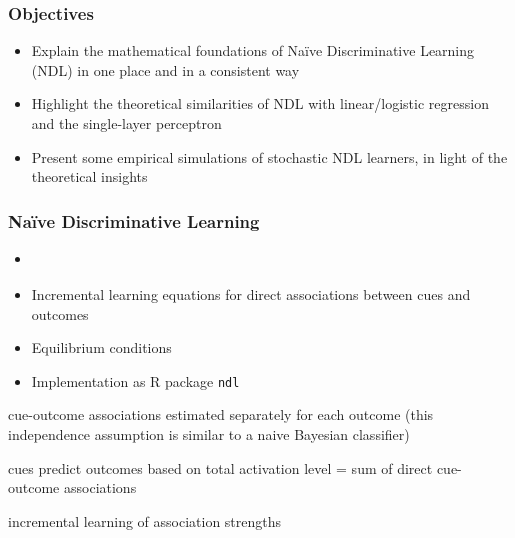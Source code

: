 \begin{frame}
  \frametitle{Objectives}

  \begin{itemize}
  \item Explain the mathematical foundations of Naïve Discriminative Learning (NDL) in one place and in a consistent way
  \item Highlight the theoretical similarities of NDL with linear/logistic regression and the single-layer perceptron
  \item Present some empirical simulations of stochastic NDL learners, in light of the theoretical insights
  \end{itemize}
\end{frame}

\begin{frame}
  \frametitle{Naïve Discriminative Learning}
  
  \begin{itemize}
  \item \citet{Baayen:11,Baayen:etc:11}
  \item Incremental learning equations for direct associations between cues and outcomes \citep{Rescorla:Wagner:72} 
  \item Equilibrium conditions \citep{Danks:03}
  \item Implementation as R package \texttt{ndl} \citep{Arppe:etc:14}
  \end{itemize}
  
  \gap[1]
  \begin{description}[Discriminative:]
   \item[Naive:] cue-outcome associations estimated separately for
    each outcome (this independence assumption is similar to
    a naive Bayesian classifier)
  \item[Discriminative:] cues predict outcomes based on total activation level
    = sum of direct cue-outcome associations
  \item[Learning:] incremental learning of association strengths
  \end{description}
\end{frame}

